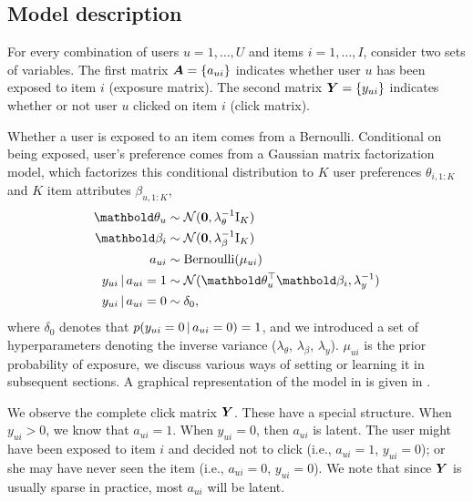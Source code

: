 \subsection{Model description}
\label{sec:model_description}

For every combination of users $u=1,\dots,U$ and items $i=1,\dots,I$, consider two sets of variables. The first matrix $\boldsymbol{A} = \left\{ a_{ui} \right\}$ indicates whether user $u$ has been exposed to item $i$ (exposure matrix). The second matrix $\boldsymbol{Y} = \left\{ y_{ui} \right\}$ indicates whether or not user $u$ clicked on item $i$ (click matrix).

Whether a user is exposed to an item comes from a Bernoulli. Conditional on being exposed, user's preference comes from a Gaussian matrix factorization model, which factorizes this conditional distribution to $K$ user preferences $\theta_{i,1:K}$ and $K$ item attributes $\beta_{u,1:K}$,
\begin{equation}
	\begin{split}
	\mb\theta_{u} &\sim \cN(\bzero, \lambda_\theta^{-1} \mathrm{I}_K) \\
	\mb\beta_{i} &\sim \cN(\bzero, \lambda_\beta^{-1} \mathrm{I}_K)  \\
	a_{ui} &\sim \mathrm{Bernoulli}(\mu_{ui}) \\
	y_{ui} \g a_{ui} = 1 &\sim \cN(\mb\theta_u^\top \mb\beta_i, \lambda_y^{-1}) \\
	y_{ui} \g a_{ui} = 0 &\sim \delta_0,
	\end{split}
	\label{chpt:expomf:eq:expo_mf}
 \end{equation}
where $\delta_0$ denotes that $p(y_{ui} = 0 \,\vert\, a_{ui} = 0) = 1$, and we
introduced a set of hyperparameters denoting the inverse variance
($\lambda_\theta$, $\lambda_\beta$, $\lambda_y$). $\mu_{ui}$ is the prior
probability of exposure, we discuss various ways of setting or learning it
in subsequent sections. 
A graphical representation of the model in  is given in . 

We observe the complete click matrix $\boldsymbol{Y}$. These have a special structure. When $y_{ui} > 0$, we know that $a_{ui} = 1$. When $y_{ui} = 0$, then $a_{ui}$ is latent. 
The user might have been exposed to item $i$ and decided not to click (i.e., $a_{ui}=1$, $y_{ui} = 0$); 
or she may have never seen the item (i.e., $a_{ui}=0$, $y_{ui}=0$). 
We note that since $\boldsymbol{Y}$ is usually sparse in practice, 
most $a_{ui}$ will be latent.

